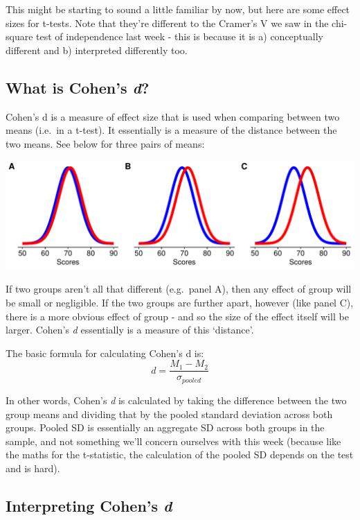 \documentclass[
]{book}
\begin{document}
This might be starting to sound a little familiar by now, but here are some effect sizes for t-tests. Note that they're different to the Cramer's V we saw in the chi-square test of independence last week - this is because it is a) conceptually different and b) interpreted differently too.

\hypertarget{what-is-cohens-d}{%
\subsection{\texorpdfstring{What is Cohen's \emph{d}?}{What is Cohen's d?}}\label{what-is-cohens-d}}

Cohen's d is a measure of effect size that is used when comparing between two means (i.e.~in a t-test). It essentially is a measure of the distance between the two means. See below for three pairs of means:

\includegraphics{_main_files/figure-latex/unnamed-chunk-139-1.pdf}

If two groups aren't all that different (e.g.~panel A), then any effect of group will be small or negligible. If the two groups are further apart, however (like panel C), there is a more obvious effect of group - and so the size of the effect itself will be larger. Cohen's \emph{d} essentially is a measure of this `distance'.

The basic formula for calculating Cohen's d is:
\[
d = \frac{M_1 - M_2}{\sigma_{pooled}}
\]

In other words, Cohen's \emph{d} is calculated by taking the difference between the two group means and dividing that by the pooled standard deviation across both groups. Pooled SD is essentially an aggregate SD across both groups in the sample, and not something we'll concern ourselves with this week (because like the maths for the t-statistic, the calculation of the pooled SD depends on the test and is hard).

\hypertarget{interpreting-cohens-d}{%
\subsection{\texorpdfstring{Interpreting Cohen's \emph{d}}{Interpreting Cohen's d}}\label{interpreting-cohens-d}}
\end{document}
